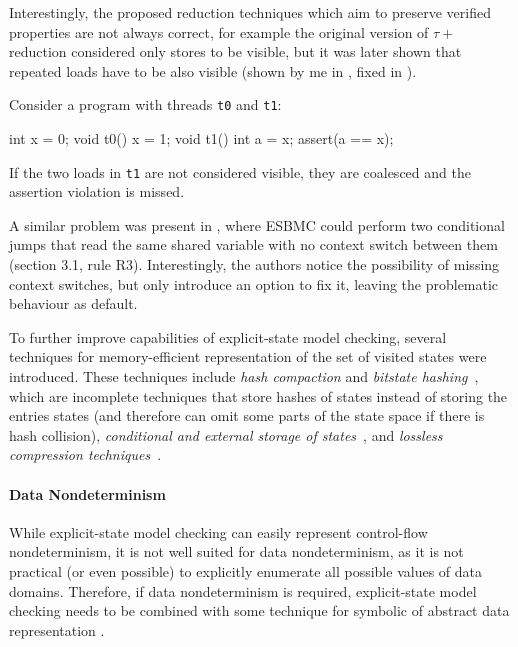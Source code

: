 Interestingly, the proposed reduction techniques which aim to preserve verified
properties are not always correct, for example the original version of $\tau+$
reduction considered only stores to be visible, but it was later shown that
repeated loads have to be also visible (shown by me in , fixed in
).\begin{marginnote}%
Consider a program with threads \texttt{t0} and \texttt{t1}:

\medskip
\begin{cppcode}
  int x = 0;
  void t0() {
    x = 1;
  }
  void t1() {
    int a = x;
    assert(a == x);
  }
\end{cppcode}
\smallskip

If the two loads in \texttt{t1} are not considered visible, they are coalesced
and the assertion violation is missed.
\end{marginnote}
%
A similar problem was present in , where ESBMC could
perform two conditional jumps that read the same shared variable with no
context switch between them (section 3.1, rule R3).
Interestingly, the authors notice the possibility of missing context switches,
but only introduce an option to fix it, leaving the problematic behaviour as
default.

To further improve capabilities of explicit-state model checking, several
techniques for memory-efficient representation of the set of visited states
were introduced.
These techniques include \emph{hash compaction} and \emph{bitstate
hashing}~, which are incomplete techniques that store
hashes of states instead of storing the entries states (and therefore can omit
some parts of the state space if there is hash collision),
\emph{conditional and external storage of states}~, and
\emph{lossless compression techniques}~.

\paragraph{Data Nondeterminism}
While explicit-state model checking can easily represent control-flow
nondeterminism, it is not well suited for data nondeterminism, as it is not
practical (or even possible) to explicitly enumerate all possible values of
data domains.
Therefore, if data nondeterminism is required, explicit-state model checking
needs to be combined with some technique for symbolic of abstract data
representation .

